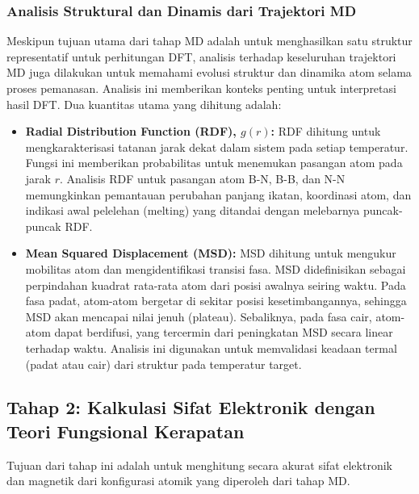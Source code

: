 \subsubsection{Analisis Struktural dan Dinamis dari Trajektori MD}
\label{sec:md_analysis}
Meskipun tujuan utama dari tahap MD adalah untuk menghasilkan satu struktur representatif untuk perhitungan DFT, analisis terhadap keseluruhan trajektori MD juga dilakukan untuk memahami evolusi struktur dan dinamika atom selama proses pemanasan. Analisis ini memberikan konteks penting untuk interpretasi hasil DFT. Dua kuantitas utama yang dihitung adalah:
\begin{itemize}
    \item \textbf{Radial Distribution Function (RDF), $g(r)$:} RDF dihitung untuk mengkarakterisasi tatanan jarak dekat dalam sistem pada setiap temperatur. Fungsi ini memberikan probabilitas untuk menemukan pasangan atom pada jarak $r$. Analisis RDF untuk pasangan atom B-N, B-B, dan N-N memungkinkan pemantauan perubahan panjang ikatan, koordinasi atom, dan indikasi awal pelelehan (melting) yang ditandai dengan melebarnya puncak-puncak RDF.
    \item \textbf{Mean Squared Displacement (MSD):} MSD dihitung untuk mengukur mobilitas atom dan mengidentifikasi transisi fasa. MSD didefinisikan sebagai perpindahan kuadrat rata-rata atom dari posisi awalnya seiring waktu. Pada fasa padat, atom-atom bergetar di sekitar posisi kesetimbangannya, sehingga MSD akan mencapai nilai jenuh (plateau). Sebaliknya, pada fasa cair, atom-atom dapat berdifusi, yang tercermin dari peningkatan MSD secara linear terhadap waktu. Analisis ini digunakan untuk memvalidasi keadaan termal (padat atau cair) dari struktur pada temperatur target.
\end{itemize}

\subsection{Tahap 2: Kalkulasi Sifat Elektronik dengan Teori Fungsional Kerapatan}
Tujuan dari tahap ini adalah untuk menghitung secara akurat sifat elektronik dan magnetik dari konfigurasi atomik yang diperoleh dari tahap MD.
